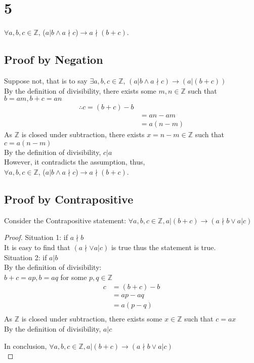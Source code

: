 \documentclass{article}
\begin{document}
\section{5}
$\forall a,b,c \in \mathbb{Z}$, ($a|b \wedge a \nmid c$)$ \rightarrow a \nmid (b+c)$.\\
\subsection{Proof by Negation}
Suppose not, that is to say $\exists a, b, c \in \mathbb{Z}$, $(a|b \wedge a \nmid c) \rightarrow (a|(b+c))$\\

By the definition of divisibility, there exists some $m,n \in \mathbb{Z}$ such that $b = am, b+c = an$ 
\begin{align*}
    \therefore
    c = (b+c) - b \tag{By algebra}\\
    &= an - am \tag{By substitution}\\
    &= a(n-m)
\end{align*}
As $\mathbb{Z}$ is closed under subtraction, there exists $x = n-m \in \mathbb{Z}$ such that $c = a(n-m)$\\
By the definition of divisibility, $c | a$\\
However, it contradicts the assumption, thus,\\
$\forall a,b,c \in \mathbb{Z}$, ($a|b \wedge a \nmid c$)$ \rightarrow a \nmid (b+c)$.\\




\subsection{Proof by Contrapositive}

Consider the Contrapositive statement:
$\forall a,b,c \in \mathbb{Z}, a|(b+c) \rightarrow (a \nmid b \vee a | c)$\\
\begin{proof}
Situation 1: if $a \nmid b$\\
It is easy to find that $(a \nmid \vee a|c)$ is true thus the statement is true.\\
Situation 2: if $a | b$\\
By the definition of divisibility:\\
$b + c = ap, b = aq$ for some $p,q \in \mathbb{Z}$\\
\begin{align*}
    c &= (b+c) -b \tag{By algebra}\\
    &= ap - aq \tag{By substitution}\\
    &= a(p-q) \tag{By algebra}\\
\end{align*}
As $\mathbb{Z}$ is closed under subtraction, there exists some $x \in \mathbb{Z}$ such that $c = ax$\\
By the definition of divisibility, $a|c$

In conclusion, $\forall a,b,c \in \mathbb{Z}, a|(b+c) \rightarrow (a \nmid b \vee a | c)$\\

\end{proof}
\end{document}
